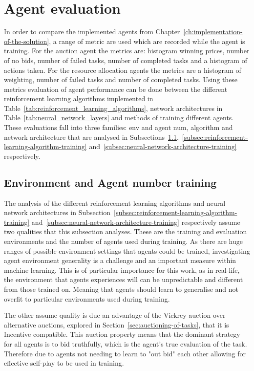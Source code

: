 \section{Agent evaluation}\label{sec:agent-evaluation}
In order to compare the implemented agents from Chapter~\ref{ch:implementation-of-the-solution}, a range of metric are
used which are recorded while the agent is training. For the auction agent the metrics are: histogram winning prices,
number of no bids, number of failed tasks, number of completed tasks and a histogram of actions taken. For the resource
allocation agents the metrics are a histogram of weighting, number of failed tasks and number of completed tasks.
Using these metrics evaluation of agent performance can be done between the different reinforcement learning algorithms
implemented in Table~\ref{tab:reinforcement_learning_algorithms}, network architectures in
Table~\ref{tab:neural_network_layers} and methods of training different agents. \\
These evaluations fall into three families: env and agent num, algorithm and network architecture that are analysed in
Subsections~\ref{subsec:environment-and-agent-number-training},~\ref{subsec:reinforcement-learning-algorithm-training}
and~\ref{subsec:neural-network-architecture-training} respectively.

\subsection{Environment and Agent number training}\label{subsec:environment-and-agent-number-training}
The analysis of the different reinforcement learning algorithms and neural network architectures in
Subsection~\ref{subsec:reinforcement-learning-algorithm-training} and~\ref{subsec:neural-network-architecture-training}
respectively assume two qualities that this subsection analyses. These are the training and evaluation environments
and the number of agents used during training. As there are huge ranges of possible environment settings that agents
could be trained, investigating agent environment generality is a challenge and an important measure within machine
learning. This is of particular importance for this work, as in real-life, the environment that agents experiences will
can be unpredictable and different from those trained on. Meaning that agents should learn to generalise and not
overfit to particular environments used during training.

The other assume quality is due an advantage of the Vickrey auction over alternative auctions, explored in
Section~\ref{sec:auctioning-of-tasks}, that it is Incentive compatible. This auction property means that the dominant
strategy for all agents is to bid truthfully, which is the agent's true evaluation of the task. Therefore due to agents
not needing to learn to "out bid" each other allowing for effective self-play to be used in training.


